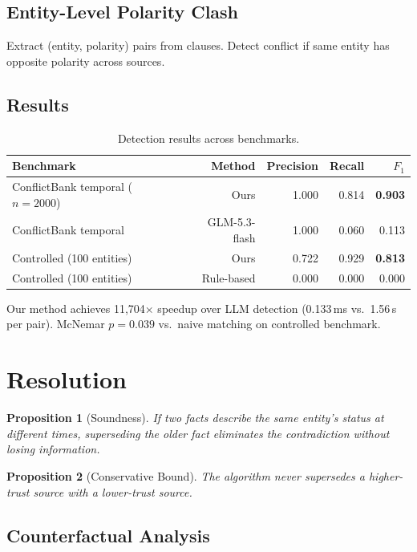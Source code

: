 \documentclass{article}
\newtheorem{proposition}{Proposition}
\begin{document}
\subsection{Entity-Level Polarity Clash}
Extract (entity, polarity) pairs from clauses. Detect conflict if same entity has opposite polarity across sources.

\subsection{Results}

\begin{table}[h]
\centering
\caption{Detection results across benchmarks.}
\begin{tabular}{lrrrr}
\toprule
Benchmark & Method & Precision & Recall & $F_1$ \\
\midrule
ConflictBank temporal ($n{=}2000$) & Ours & 1.000 & 0.814 & \textbf{0.903} \\
ConflictBank temporal & GLM-5.3-flash & 1.000 & 0.060 & 0.113 \\
Controlled (100 entities) & Ours & 0.722 & 0.929 & \textbf{0.813} \\
Controlled (100 entities) & Rule-based & 0.000 & 0.000 & 0.000 \\
\bottomrule
\end{tabular}
\end{table}

Our method achieves 11{,}704$\times$ speedup over LLM detection (0.133\,ms vs.\ 1.56\,s per pair). McNemar $p=0.039$ vs.\ naive matching on controlled benchmark.

\section{Resolution}
\label{sec:resolve}

\begin{proposition}[Soundness]
If two facts describe the same entity's status at different times, superseding the older fact eliminates the contradiction without losing information.
\end{proposition}

\begin{proposition}[Conservative Bound]
The algorithm never supersedes a higher-trust source with a lower-trust source.
\end{proposition}

\subsection{Counterfactual Analysis}
\end{document}
